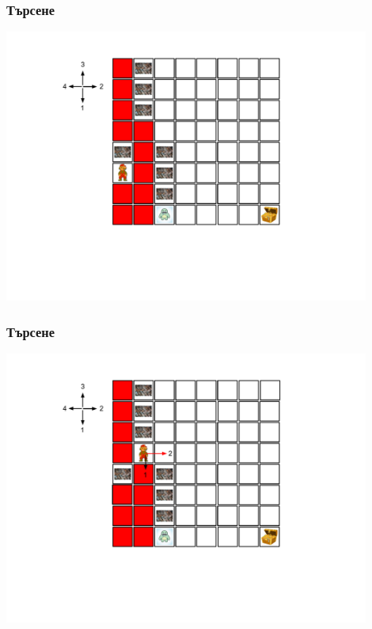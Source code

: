 \documentclass{beamer}
\begin{document}
\begin{frame}[fragile]
\frametitle{Търсене}
\includegraphics[width=12cm]{images/lab_dead1}
\end{frame}



\begin{frame}[fragile]
\frametitle{Търсене}
\includegraphics[width=12cm]{images/lab_choice_01}
\end{frame}
\end{document}

